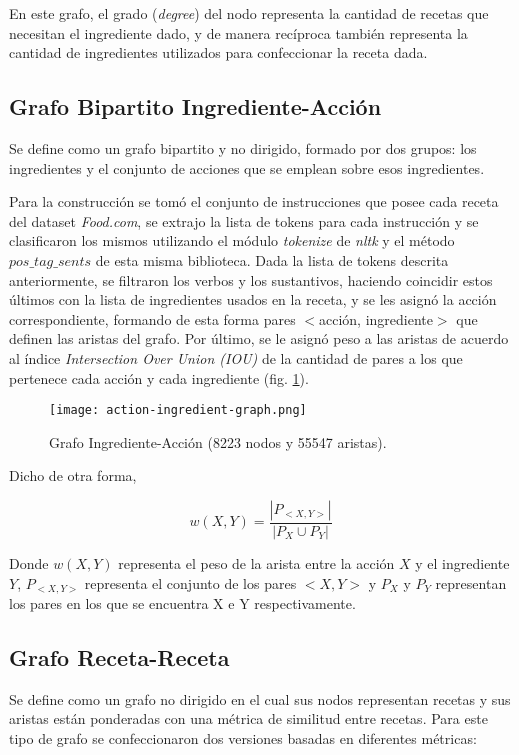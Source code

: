\documentclass[
	a4paper, %
	10pt, %
	unnumberedsections, %
	twoside, %
]{LTJournalArticle}
\begin{document}
En este grafo, el grado (\textit{degree}) del nodo representa la cantidad de recetas que necesitan
el ingrediente dado, y de manera recíproca también representa la cantidad de ingredientes utilizados para 
confeccionar la receta dada.

\subsection{Grafo Bipartito Ingrediente-Acción}

Se define como un grafo bipartito y no dirigido, formado por dos grupos: los ingredientes y el conjunto de acciones que se emplean sobre esos ingredientes. 

Para la construcción se tomó el conjunto de instrucciones que posee cada receta del dataset \textit{Food.com}, se extrajo la lista de tokens para cada instrucción y se clasificaron los mismos utilizando el módulo \emph{tokenize} de \textit{nltk} y el método \emph{$pos\_tag\_sents$} de esta misma biblioteca. Dada la lista de tokens descrita anteriormente, se filtraron los verbos y los sustantivos, haciendo coincidir estos últimos con la lista de ingredientes usados en la receta, y se les asignó la acción correspondiente, formando de esta forma pares $<$acción, ingrediente$>$ que definen las aristas del grafo. Por último, se le asignó peso a las aristas de acuerdo al índice \textit{Intersection Over Union (IOU)} de la cantidad de pares a los que pertenece cada acción y cada ingrediente (fig. \ref{fig:ingredient-action-graph}). 

\begin{figure}
	\texttt{[image: action-ingredient-graph.png]}
	\caption{Grafo Ingrediente-Acción (8223 nodos y 55547 aristas).}
	\label{fig:ingredient-action-graph}
\end{figure}

Dicho de otra forma,

$$w(X, Y) = \frac{|P_{<X,Y>}|}{|P_X \cup P_Y|}$$

Donde $w(X,Y)$ representa el peso de la arista entre la acción $X$ y el ingrediente $Y$, $P_{<X,Y>}$ representa el conjunto de los pares $<X,Y>$ y $P_X$ y $P_Y$ representan los pares en los que se encuentra X e Y respectivamente.


\subsection{Grafo Receta-Receta}

Se define como un grafo no dirigido en el cual sus nodos representan recetas y sus aristas
están ponderadas con una métrica de similitud entre recetas. Para este tipo de grafo se confeccionaron dos 
versiones basadas en diferentes métricas:
\end{document}
